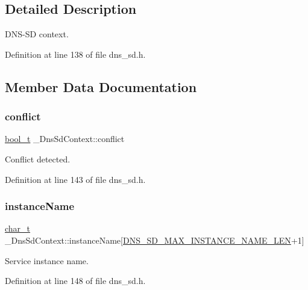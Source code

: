 \subsection{Detailed Description}
D\+N\+S-\/\+SD context. 

Definition at line 138 of file dns\+\_\+sd.\+h.



\subsection{Member Data Documentation}
\mbox{\label{struct__DnsSdContext_ad7dc69e9252bbd856e866c93d9de9de6}} 
\subsubsection{\texorpdfstring{conflict}{conflict}}
{\footnotesize\ttfamily \hyperlink{compiler__port_8h_a812d16e5494522586b3784e55d479912}{bool\+\_\+t} \+\_\+\+Dns\+Sd\+Context\+::conflict}



Conflict detected. 



Definition at line 143 of file dns\+\_\+sd.\+h.

\mbox{\label{struct__DnsSdContext_a05168e403e00c734618bc6369e6ad304}} 
\subsubsection{\texorpdfstring{instance\+Name}{instanceName}}
{\footnotesize\ttfamily \hyperlink{compiler__port_8h_a40bb5262bf908c328fbcfbe5d29d0201}{char\+\_\+t} \+\_\+\+Dns\+Sd\+Context\+::instance\+Name\mbox{[}\hyperlink{dns__sd_8h_acbbd239513bf1078f6b8b4b7bccff7cf}{D\+N\+S\+\_\+\+S\+D\+\_\+\+M\+A\+X\+\_\+\+I\+N\+S\+T\+A\+N\+C\+E\+\_\+\+N\+A\+M\+E\+\_\+\+L\+EN}+1\mbox{]}}



Service instance name. 



Definition at line 148 of file dns\+\_\+sd.\+h.

